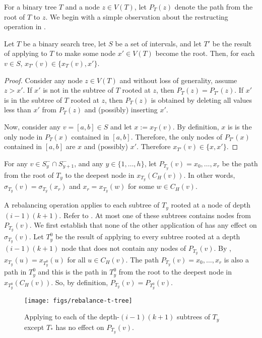 \documentclass[kpfonts]{patmorin}
\begin{document}
For a binary tree $T$ and a node $z\in V(T)$, let $P_T(z)$ denote the path from the root of $T$ to $z$.  We begin with a simple observation about the restructing operation in .

\begin{obs}
  Let $T$ be a binary search tree, let $S$ be a set of intervals, and let $T'$ be the result of applying  to $T$ to make some node $x'\in V(T)$ become the root.  Then, for each $v\in S$, $x_{T'}(v)\in\{x_T(v), x'\}$.
\end{obs}

\begin{proof}
  Consider any node $z\in V(T)$ and without loss of generality, assume $z>x'$. 
  If $x'$ is not in the subtree of $T$ rooted at $z$, then $P_T(z)=P_{T'}(z)$.  If $x'$ is in the subtree of $T$ rooted at $z$, then $P_T(z)$ is obtained by deleting all values less than $x'$ from $P_T(z)$ and (possibly) inserting $x'$.
  
  Now, consider any $v=[a,b]\in S$ and let $x:=x_T(v)$. By definition, $x$ is is the only node in $P_T(x)$ contained in $[a,b]$. Therefore, the only nodes of $P_{T'}(x)$ contained in $[a,b]$ are $x$ and (possibly) $x'$.  Therefore $x_{T'}(v)\in \{x,x'\}$.
\end{proof}

For any $v\in S^-_{y}\cap S^-_{y+1}$, and any $y\in\{1,\ldots,h\}$, let $P_{T_y}(v)=x_0,\ldots,x_r$ be the path from the root of $T_y$ to the deepest node in $x_{T_y}(C_H(v))$.  In other words, $\sigma_{T_y}(v)=\sigma_{T_y}(x_r)$ and $x_r=x_{T_y}(w)$ for some $w\in C_H(v)$.

A rebalancing operation applies  to each subtree of $T_y$ rooted at a node of depth $(i-1)(k+1)$.  Refer to . At most one of these subtrees contains nodes from $P_{T_y}(v)$. We first establish that none of the other application of  has any effect on $\sigma_{T_y}(v)$.  Let $T_y^0$ be the result of applying  to every subtree rooted at a depth $(i-1)(k+1)$ node that does not contain any nodes of $P_{T_y}(v)$.  By , $x_{T_y}(u)=x_{T_y^0}(u)$ for all $u\in C_H(v)$.  The path $P_{T_y}(v)=x_0,\ldots,x_r$ is also a path in $T_y^0$ and this is the path in $T_y^0$ from the root to the deepest node in $x_{T_y^0}(C_H(v))$. So, by definition, $P_{T_y}(v)=P_{T_y^0}(v)$.

\begin{figure}
  \begin{center}
    \texttt{[image: figs/rebalance-t-tree]}
  \end{center}
  \caption{Applying  to each of the depth-$(i-1)(k+1)$ subtrees of $T_y$ except $T_*$ has no effect on $P_{T_y}(v)$.}
\end{figure}
\end{document}
